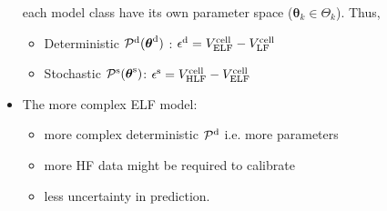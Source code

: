 \documentclass[10pt,xcolor=dvipsnames,compress]{beamer}
\begin{document}
\begin{frame}
\begin{columns}
\begin{block}{}
\begin{itemize}
each model class have its own parameter space ($\boldsymbol{\theta}_k \in \Theta_k$). Thus,

\begin{itemize}
\item Deterministic $\mathcal{P}^{\rm d}(\boldsymbol{\theta}^{\rm d})$ :
$\epsilon^{\rm d} = V^{\rm cell}_{\rm ELF} -  V^{\rm cell}_{\rm LF}$
\item Stochastic $\mathcal{P}^{\rm s}(\boldsymbol{\theta}^{\rm s})$: 
$\epsilon^{\rm s} = V^{\rm cell}_{\rm HLF} -  V^{\rm cell}_{\rm ELF}$
\end{itemize}


\item The more complex ELF model:
\begin{itemize}
\item more complex deterministic $\mathcal{P}^{\rm d}$ i.e. more parameters
\item more HF data might be required to calibrate 
\item less uncertainty in prediction.
\end{itemize}

\end{itemize}
\end{block}


\end{columns}


\vfill
\end{frame}
\end{document}
